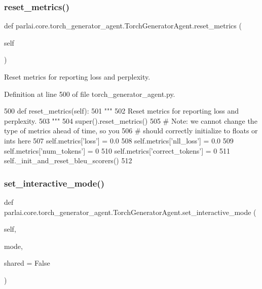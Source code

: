 \subsubsection{\texorpdfstring{reset\+\_\+metrics()}{reset\_metrics()}}
{\footnotesize\ttfamily def parlai.\+core.\+torch\+\_\+generator\+\_\+agent.\+Torch\+Generator\+Agent.\+reset\+\_\+metrics (\begin{DoxyParamCaption}\item[{}]{self }\end{DoxyParamCaption})}

\begin{DoxyVerb}Reset metrics for reporting loss and perplexity.
\end{DoxyVerb}
 

Definition at line 500 of file torch\+\_\+generator\+\_\+agent.\+py.


\begin{DoxyCode}
500     \textcolor{keyword}{def }reset\_metrics(self):
501         \textcolor{stringliteral}{"""}
502 \textcolor{stringliteral}{        Reset metrics for reporting loss and perplexity.}
503 \textcolor{stringliteral}{        """}
504         super().reset\_metrics()
505         \textcolor{comment}{# Note: we cannot change the type of metrics ahead of time, so you}
506         \textcolor{comment}{# should correctly initialize to floats or ints here}
507         self.metrics[\textcolor{stringliteral}{'loss'}] = 0.0
508         self.metrics[\textcolor{stringliteral}{'nll\_loss'}] = 0.0
509         self.metrics[\textcolor{stringliteral}{'num\_tokens'}] = 0
510         self.metrics[\textcolor{stringliteral}{'correct\_tokens'}] = 0
511         self.\_init\_and\_reset\_bleu\_scorers()
512 
\end{DoxyCode}
\mbox{\label{classparlai_1_1core_1_1torch__generator__agent_1_1TorchGeneratorAgent_a8a3c13d2b8988d2a0cbb71f44ae81f52}} 
\subsubsection{\texorpdfstring{set\+\_\+interactive\+\_\+mode()}{set\_interactive\_mode()}}
{\footnotesize\ttfamily def parlai.\+core.\+torch\+\_\+generator\+\_\+agent.\+Torch\+Generator\+Agent.\+set\+\_\+interactive\+\_\+mode (\begin{DoxyParamCaption}\item[{}]{self,  }\item[{}]{mode,  }\item[{}]{shared = {\ttfamily False} }\end{DoxyParamCaption})}

